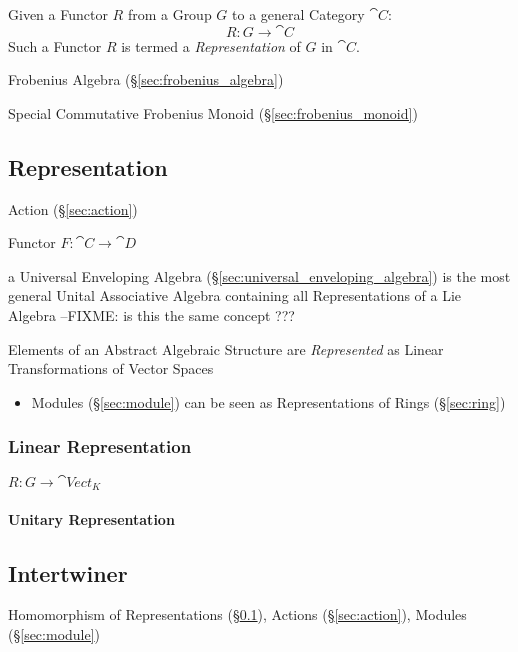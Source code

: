 Given a Functor $R$ from a Group $G$ to a general Category
$\cat{C}$:
\[
    R : G \rightarrow \cat{C}
\]
Such a Functor $R$ is termed a \emph{Representation} of $G$ in
$\cat{C}$.

Frobenius Algebra (\S\ref{sec:frobenius_algebra})

Special Commutative Frobenius Monoid (\S\ref{sec:frobenius_monoid})



\subsection{Representation}\label{sec:representation}

Action (\S\ref{sec:action})

Functor $F : \cat{C} \rightarrow \cat{D}$

\fist a Universal Enveloping Algebra (\S\ref{sec:universal_enveloping_algebra})
is the most general Unital Associative Algebra containing all Representations
of a Lie Algebra
--FIXME: is this the same concept ???

Elements of an Abstract Algebraic Structure are \emph{Represented} as Linear
Transformations of Vector Spaces

\begin{itemize}
  \item Modules (\S\ref{sec:module}) can be seen as Representations of Rings
    (\S\ref{sec:ring})
\end{itemize}




\subsubsection{Linear Representation}\label{sec:linear_representation}

$R : G \rightarrow \cat{Vect}_K$



\paragraph{Unitary Representation}\label{sec:unitary_representation}



\subsection{Intertwiner}\label{sec:intertwiner}

Homomorphism of Representations (\S\ref{sec:representation}), Actions
(\S\ref{sec:action}), Modules (\S\ref{sec:module})


